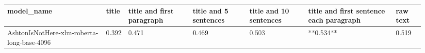 \begin{tabular}{lllllll}
\toprule
                                model\_name & title & title and first paragraph & title and 5 sentences & title and 10 sentences & title and first sentence each paragraph & raw text \\
\midrule
AshtonIsNotHere-xlm-roberta-long-base-4096 & 0.392 &                     0.471 &                 0.469 &                  0.503 &                               **0.534** &    0.519 \\
\bottomrule
\end{tabular}
